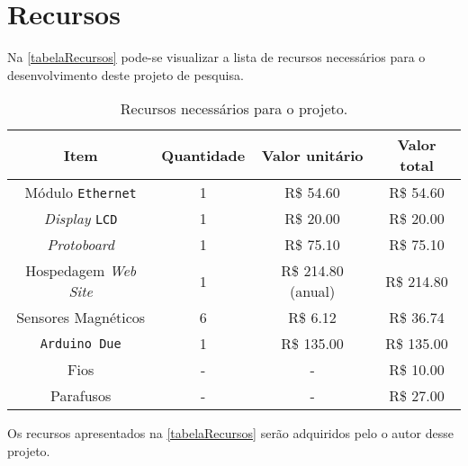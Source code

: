 \chapter[Recursos]{Recursos}

Na \autoref{tabelaRecursos} pode-se visualizar a lista de recursos necessários para o desenvolvimento deste projeto de pesquisa.

\begin{table}[htb]
	\ABNTEXfontereduzida	
	\begin{center}
		\caption[Recursos]{Recursos necessários para o projeto.}
		\label{tabelaRecursos}
		\begin{tabular}{ |c|c|c|c| }
		   	\hline
		   	\textbf{Item} & \textbf{Quantidade} & \textbf{Valor unitário} & \textbf{Valor total} \\
		   	\hline
		    	Módulo \texttt{Ethernet} & 1 & R\$ 54.60 & R\$ 54.60 \\
			\hline
			\textit{Display} \texttt{LCD} & 1 & R\$ 20.00 & R\$ 20.00 \\
			\hline
			\textit{Protoboard} & 1 & R\$ 75.10 & R\$ 75.10 \\
			\hline
			Hospedagem \textit{Web Site} & 1 & R\$ 214.80 (anual) & R\$ 214.80 \\
			\hline
			Sensores Magnéticos & 6 & R\$ 6.12 & R\$ 36.74 \\
			\hline
			\texttt{Arduino Due} & 1 & R\$ 135.00 & R\$ 135.00 \\
			\hline
			Fios & - & - & R\$ 10.00 \\
			\hline
			Parafusos & - & - & R\$ 27.00 \\
			\hline
		\end{tabular}
	\end{center}
\end{table}

Os recursos apresentados na \autoref{tabelaRecursos} serão adquiridos pelo o autor desse projeto.